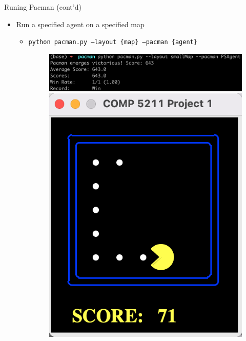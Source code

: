 \documentclass{beamer}
\begin{document}
\begin{frame}{Runing Pacman (cont'd)}
    \begin{itemize}
        \item Run a specified agent on a specified map
        \begin{itemize}
             \item \texttt{python pacman.py --layout \{map\} --pacman \{agent\}}
             \begin{figure}[htpb]
                \centering
                \includegraphics[width=1\linewidth]{pic/runpsagent.png}
                \includegraphics[width=0.4\linewidth]{pic/psagent.png}
            \end{figure}
        \end{itemize}
    \end{itemize}
\end{frame}


    

\end{document}
